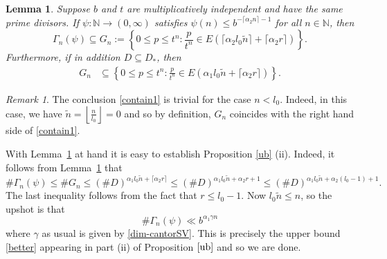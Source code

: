 \documentclass[12pt]{article}
\newtheorem{lemma}{Lemma}[section]
\theoremstyle{definition}
\theoremstyle{remark}
\newtheorem{remark}{{Remark}}[section]
\newcommand{\red}[1]{\textcolor[rgb]{1.00,0.00,0.00}{#1}}
\newcommand{\sv}[1]{{\color{blue}   {#1}}}
\begin{document}
\begin{lemma}\label{important}
Suppose $b$ and $t$ are multiplicatively independent and have the same prime divisors. If  $\psi:\mathbb{N}\to(0,\infty)$  satisfies $\psi(n)\le b^{-\lceil\alpha_{2}n\rceil-1}$  for all $n\in\mathbb{N}$, then
\begin{equation}\label{qwrt}\Gamma_{n}(\psi)\subseteq G_{n}:=\left\{0\le p\le t^{n}:\frac{p}{t^{n}}\in E (\lceil\alpha_{2}l_{0}\tilde{n}\rceil+\lceil\alpha_{2}r\rceil) \right\}.
\end{equation}
Furthermore,  if in addition  $D\subseteq D_{*}$, then
\begin{equation}\label{contain1}
\begin{aligned}
    G_{n} 
   &\subseteq\left\{0\le p\le t^{n}:\frac{p}{t^{n}}\in E(\alpha_{1}l_{0}\tilde{n} +\lceil\alpha_{2}r\rceil)   \right\}.
\end{aligned}
\end{equation}
\end{lemma}



\bigskip

\begin{remark}\label{trivial}
The conclusion \eqref{contain1} is trivial for the case $n<l_{0}$. Indeed, in this case, we have $\tilde{n}=\left\lfloor\frac{n}{l_{0}}\right\rfloor=0$ and so  by definition,  
$G_{n}$ coincides with the right hand side of  \eqref{contain1}.  

\end{remark}   


 \bigskip 
With Lemma~\ref{important} at hand it 
is easy to establish  Proposition \ref{ub} (ii). 
Indeed, it follows from Lemma~\ref{important} that
$$\#\Gamma_{n}(\psi)\leq\#G_{n}\leq(\#D)^{\alpha_{1}l_{0}\tilde{n}+\lceil\alpha_{2}r\rceil}\leq(\#D)^{\alpha_{1}l_{0}\tilde{n}+\alpha_{2}r+1}\leq(\#D)^{\alpha_{1}l_{0}\tilde{n}+\alpha_{2}(l_{0}-1)+1}.$$
The last inequality follows from the fact that  $r\leq l_{0}-1$. Now  $l_{0}\tilde{n}\leq n$, so the upshot is that 
$$\#\Gamma_{n}(\psi)\ll b^{\alpha_{1}\gamma n}   $$
where $ \gamma $ as usual is given by   \eqref{dim-cantorSV}.   This is precisely the  upper bound  \eqref{better}  appearing in part (ii) of Proposition $\ref{ub}$ and so we are done. 
\end{document}
